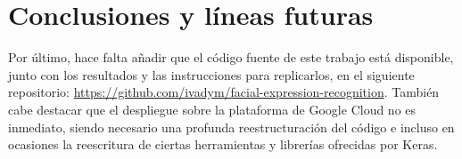 \chapter{Conclusiones y líneas futuras} \label{Chapter:8}



Por último, hace falta añadir que el código fuente de este trabajo está disponible, junto con los resultados y las instrucciones para replicarlos, en el siguiente repositorio: \url{https://github.com/ivadym/facial-expression-recognition}.
También cabe destacar que el despliegue sobre la plataforma de Google Cloud no es inmediato, siendo necesario una profunda reestructuración del código e incluso en ocasiones la reescritura de ciertas herramientas y librerías ofrecidas por Keras.
